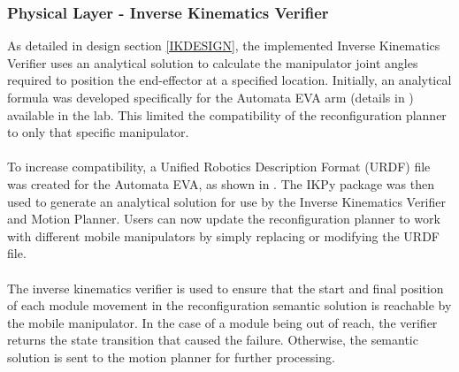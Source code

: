\subsubsection{Physical Layer - Inverse Kinematics Verifier}
As detailed in design section \ref{IKDESIGN}, the implemented Inverse Kinematics Verifier uses an analytical solution to calculate the manipulator joint angles required to position the end-effector at a specified location. Initially, an analytical formula was developed specifically for the Automata EVA arm (details in ) available in the lab. This limited the compatibility of the reconfiguration planner to only that specific manipulator.
\\\\
To increase compatibility, a Unified Robotics Description Format (URDF) file was created for the Automata EVA, as shown in . The IKPy package \cite{ikpy} was then used to generate an analytical solution for use by the Inverse Kinematics Verifier and Motion Planner. Users can now update the reconfiguration planner to work with different mobile manipulators by simply replacing or modifying the URDF file.
\\\\
The inverse kinematics verifier is used to ensure that the start and final position of each module movement in the reconfiguration semantic solution is reachable by the mobile manipulator. In the case of a module being out of reach, the verifier returns the state transition that caused the failure. Otherwise, the semantic solution is sent to the motion planner for further processing.

